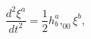 \begin{equation}
\frac{d^{2}\xi ^{a}}{dt^{2}}=\frac{1}{2}h_{b}^{a},_{00}\xi ^{b},  \label{38}
\end{equation}

